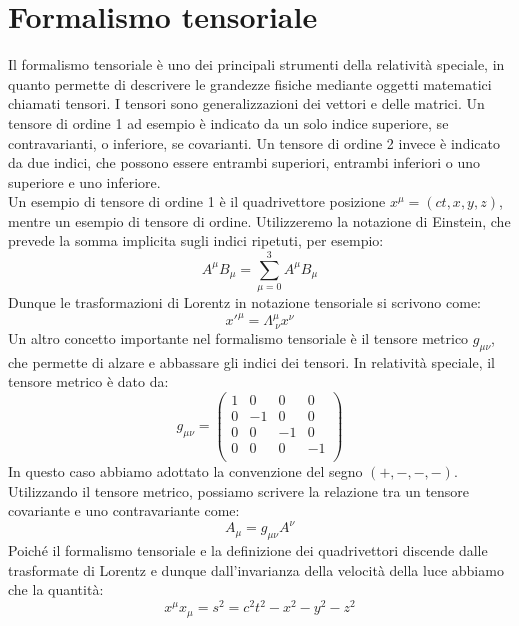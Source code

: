\section{Formalismo tensoriale}
Il formalismo tensoriale è uno dei principali strumenti della relatività speciale, in quanto permette di descrivere le grandezze fisiche mediante oggetti matematici chiamati tensori. I tensori sono generalizzazioni dei vettori e delle matrici. Un tensore di ordine 1 ad esempio è indicato da un solo indice superiore, se contravarianti, o inferiore, se covarianti. Un tensore di ordine 2 invece è indicato da due indici, che possono essere entrambi superiori, entrambi inferiori o uno superiore e uno inferiore.\\
Un esempio di tensore di ordine 1 è il quadrivettore posizione $x^\mu = (ct, x, y, z)$, mentre un esempio di tensore di ordine. Utilizzeremo la notazione di Einstein, che prevede la somma implicita sugli indici ripetuti, per esempio:
\begin{equation}
    A^\mu B_\mu = \sum_{\mu=0}^{3} A^\mu B_\mu
\end{equation}
Dunque le trasformazioni di Lorentz in notazione tensoriale si scrivono come:
\begin{equation}
    x'^\mu = \Lambda^\mu_{\ \nu} x^\nu
\end{equation}
Un altro concetto importante nel formalismo tensoriale è il tensore metrico $g_{\mu \nu}$, che permette di alzare e abbassare gli indici dei tensori. In relatività speciale, il tensore metrico è dato da:
\begin{equation}
    g_{\mu \nu} =
    \begin{pmatrix}
        1 & 0 & 0 & 0 \\
        0 & -1 & 0 & 0 \\
        0 & 0 & -1 & 0 \\
        0 & 0 & 0 & -1 \\
    \end{pmatrix}
\end{equation}
In questo caso abbiamo adottato la convenzione del segno $(+,-,-,-)$. Utilizzando il tensore metrico, possiamo scrivere la relazione tra un tensore covariante e uno contravariante come:
\begin{equation}
    A_\mu = g_{\mu \nu} A^\nu
\end{equation}
Poiché il formalismo tensoriale e la definizione dei quadrivettori discende dalle trasformate di Lorentz e dunque dall'invarianza della velocità della luce abbiamo che la quantità:
\begin{equation}
    x^\mu x_\mu = s^2 = c^2 t^2 - x^2 - y^2 - z^2
\end{equation}
